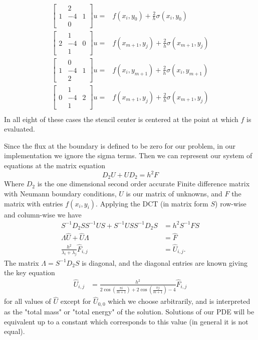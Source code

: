 \documentclass[12pt]{article}
\begin{document}
\begin{align*}
\begin{bmatrix}&2&\\1&-4&1\\&0&\end{bmatrix}u =& f(x_i,y_0) + \frac{2}{h} \sigma(x_i, y_0) \tag{Southern} \\
\begin{bmatrix}&1&\\2&-4&0\\&1&\end{bmatrix}u =& f(x_{m+1},y_j) + \frac{2}{h} \sigma(x_{m+1}, y_j) \tag{Eastern} \\
\begin{bmatrix}&0&\\1&-4&1\\&2&\end{bmatrix}u =& f(x_i,y_{m+1}) + \frac{2}{h} \sigma(x_i, y_{m+1}) \tag{Northern} \\
\begin{bmatrix}&1&\\0&-4&2\\&1&\end{bmatrix}u =& f(x_{m+1},y_j) + \frac{2}{h} \sigma(x_{m+1}, y_j) \tag{Western} \\
\end{align*}
In all eight of these cases the stencil center is centered at the point at which $f$ is evaluated. \bigbreak

Since the flux at the boundary is defined to be zero for our problem, in our implementation we ignore the sigma terms. Then we can represent our system of equations at the matrix equation
$$
D_2U + U D_2 = h^2F
$$
Where $D_2$ is the one dimensional second order accurate Finite difference matrix with Neumann boundary conditions, $U$ is our matrix of unknowns, and $F$ the matrix with entries $f(x_i,y_i)$. Applying the DCT (in matrix form $S$) row-wise and column-wise we have
\begin{align*}
S^{-1}D_2 S S^{-1}US + S^{-1}US S^{-1}D_2S &= h^2S^{-1} F S \\
\Lambda \hat{U} + \hat{U} \Lambda &= \hat{F} \\
\frac{h^2}{\lambda_{i} + \lambda_{j}} \hat{F}_{i,j} &= \hat{U}_{i,j}.
\end{align*}
The matrix $\Lambda = S^{-1}D_2S$ is diagonal, and the diagonal entries are known giving the key equation
\begin{align}
\hat{U}_{i,j} &= \frac{h^2}{2\cos(\frac{\pi i}{m+1}) + 2\cos(\frac{\pi j}{m+1})-4}\hat{F}_{i,j} \label{keyEquation}
\end{align}
for all values of $\hat{U}$ except for $\hat{U}_{0,0}$ which we choose arbitrarily, and is interpreted as the "total mass" or "total energy" of the solution. Solutions of our PDE will be equivalent up to a constant which corresponds to this value (in general it is not equal). \bigbreak
\end{document}
